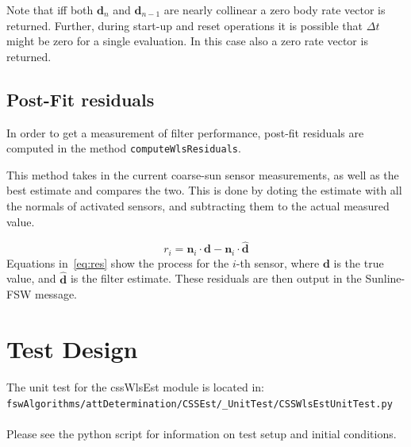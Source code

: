 \documentclass[]{BasiliskReportMemo}
\begin{document}
Note that iff both $\bm d_{n}$ and $\bm d_{n-1}$ are nearly collinear a zero body rate vector is returned.  Further, during start-up and reset operations it is possible that $\Delta t$ might be zero for a single evaluation.  In this case also a zero rate vector is returned.  
 
\subsection{Post-Fit residuals}
In order to get a measurement of filter performance, post-fit residuals are computed in the method \texttt{computeWlsResiduals}.

This method takes in the current coarse-sun sensor measurements, as well as the best estimate and compares the two.
This is done by doting the estimate with all the normals of activated sensors, and subtracting them to the actual measured value.

\begin{equation}
	\label{eq:res}
	r_i = \bm n_i \cdot \bm d - \bm n_i \cdot \hat{\bm d}
\end{equation}
Equations in~\ref{eq:res} show the process for the $i$-th sensor, where $\bm d$ is the true value, and $\hat{\bm d}$ is the filter estimate. These residuals are then output in the Sunline-FSW message. 
 

\section{Test Design}
The unit test for the cssWlsEst module is located in:\\

\noindent
{\tt fswAlgorithms/attDetermination/CSSEst/\_UnitTest/CSSWlsEstUnitTest.py} \\
\\

Please see the python script for information on test setup and initial 
conditions.  \\
\end{document}
